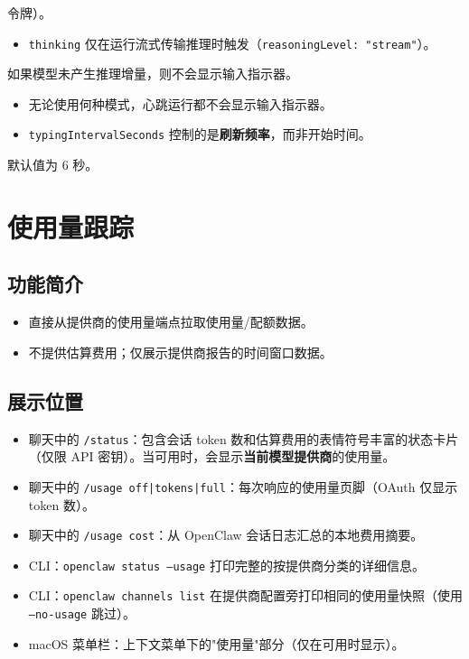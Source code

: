 令牌）。
\begin{itemize}
  \item \texttt{thinking} 仅在运行流式传输推理时触发（\texttt{reasoningLevel: "stream"}）。
\end{itemize}

如果模型未产生推理增量，则不会显示输入指示器。
\begin{itemize}
  \item 无论使用何种模式，心跳运行都不会显示输入指示器。
  \item \texttt{typingIntervalSeconds} 控制的是\textbf{刷新频率}，而非开始时间。
\end{itemize}

默认值为 6 秒。


\clearpage

\section{使用量跟踪}


\subsection{功能简介}


\begin{itemize}
  \item 直接从提供商的使用量端点拉取使用量/配额数据。
  \item 不提供估算费用；仅展示提供商报告的时间窗口数据。
\end{itemize}


\subsection{展示位置}


\begin{itemize}
  \item 聊天中的 \texttt{/status}：包含会话 token 数和估算费用的表情符号丰富的状态卡片（仅限 API 密钥）。当可用时，会显示\textbf{当前模型提供商}的使用量。
  \item 聊天中的 \texttt{/usage off|tokens|full}：每次响应的使用量页脚（OAuth 仅显示 token 数）。
  \item 聊天中的 \texttt{/usage cost}：从 OpenClaw 会话日志汇总的本地费用摘要。
  \item CLI：\texttt{openclaw status --usage} 打印完整的按提供商分类的详细信息。
  \item CLI：\texttt{openclaw channels list} 在提供商配置旁打印相同的使用量快照（使用 \texttt{--no-usage} 跳过）。
  \item macOS 菜单栏：上下文菜单下的"使用量"部分（仅在可用时显示）。
\end{itemize}



